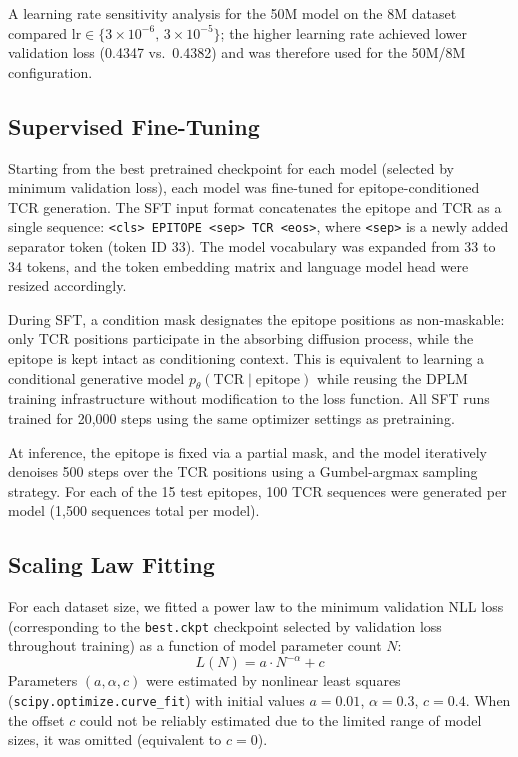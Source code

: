 \documentclass[12pt]{article}
\begin{document}
A learning rate sensitivity analysis for the 50M model on the 8M dataset compared
$\text{lr} \in \{3 \times 10^{-6},\, 3 \times 10^{-5}\}$; the higher learning rate achieved
lower validation loss (0.4347 vs.\ 0.4382) and was therefore used for the 50M/8M
configuration.

\subsection{Supervised Fine-Tuning}

Starting from the best pretrained checkpoint for each model (selected by minimum validation
loss), each model was fine-tuned for epitope-conditioned TCR generation. The SFT input format concatenates the epitope and TCR as a single sequence:
\texttt{<cls> EPITOPE <sep> TCR <eos>}, where \texttt{<sep>} is a newly added separator token
(token ID 33). The model vocabulary was expanded from 33 to 34 tokens, and the token embedding
matrix and language model head were resized accordingly.

During SFT, a condition mask designates the epitope positions as non-maskable: only TCR
positions participate in the absorbing diffusion process, while the epitope is kept intact as
conditioning context. This is equivalent to learning a conditional generative model
$p_\theta(\text{TCR} \mid \text{epitope})$ while reusing the DPLM training infrastructure
without modification to the loss function. All SFT runs trained for 20,000 steps using the
same optimizer settings as pretraining.

At inference, the epitope is fixed via a partial mask, and the model iteratively denoises
500 steps over the TCR positions using a Gumbel-argmax sampling strategy. For each of the 15 test epitopes, 100 TCR sequences were generated per model (1,500 sequences total per model).

\subsection{Scaling Law Fitting}

For each dataset size, we fitted a power law to the minimum validation NLL loss
(corresponding to the \texttt{best.ckpt} checkpoint selected by validation loss throughout
training) as a function of model parameter count $N$:
\begin{equation}
L(N) = a \cdot N^{-\alpha} + c
\label{eq:powerlaw}
\end{equation}
Parameters $(a, \alpha, c)$ were estimated by nonlinear least squares
(\texttt{scipy.optimize.curve\_fit}) with initial values $a = 0.01$, $\alpha = 0.3$,
$c = 0.4$. When the offset $c$ could not be reliably estimated due to the limited range
of model sizes, it was omitted (equivalent to $c = 0$).
\end{document}
